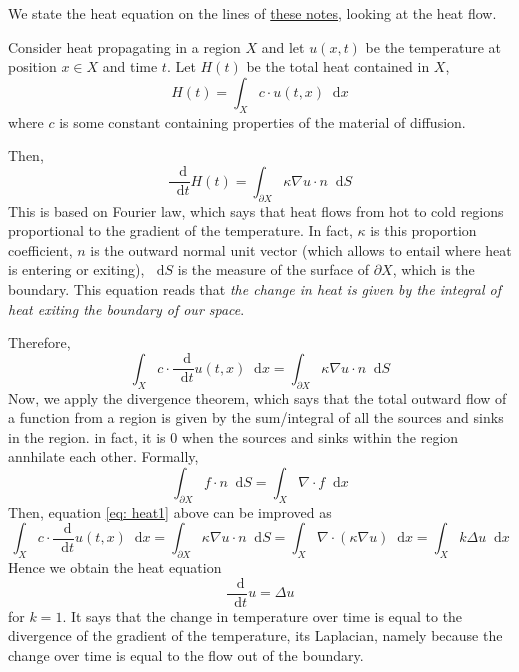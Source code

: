 \documentclass[a4paper,12pt,reqno]{amsbook}
\theoremstyle{definition} %
\newcommand*\de{\mathop{}\!\mathrm{d}}
\newcommand{\1}{\mathbbm{1}}
\newcommand{\nabladot}{\nabla \cdot} %
\newcommand{\dt}{\frac{\de}{\de t}}
\theoremstyle{plain}
\theoremstyle{remark}
\begin{document}
{We state the heat equation on the lines of \href{https://web.stanford.edu/class/math220b/handouts/heateqn.pdf}{these notes}, looking at the heat flow. 

Consider heat propagating in a region $X$ and let $u(x,t)$ be the temperature at position $x\in X$ and time $t$. Let $H(t)$ be the total heat contained in $X$, 
\[
H(t)=\int_X c \cdot u(t,x) \de x
\]
where $c$ is some constant containing properties of the material of diffusion. 

Then,
\[
\frac{\de}{\de t}H(t) = \int_{\partial X} \kappa \nabla u \cdot n \de S
\]
This is based on Fourier law, which says that heat flows from hot to cold regions proportional to the gradient of the temperature. In fact, $\kappa$ is this proportion coefficient, $n$ is the outward normal unit vector (which allows to entail where heat is entering or exiting), $\de S$ is the measure of the surface of $\partial X$, which is the boundary. This equation reads that \textit{the change in heat is given by the integral of heat exiting the boundary of our space}. 

Therefore,
\begin{equation}\label{eq: heat1}
\int_X c \cdot \dt u(t,x) \de x = \int_{\partial X} \kappa \nabla u \cdot n \de S
\end{equation}
Now, we apply the divergence theorem, which says that the total outward flow of a function from a region is given by the sum/integral of all the sources and sinks in the region. in fact, it is 0 when the sources and sinks within the region annhilate each other. Formally, 
\[
\int_{\partial X} f \cdot n \de S = \int_X \nabladot f \de x
\]
Then, equation \ref{eq: heat1} above can be improved as
\begin{equation*}
\int_X c \cdot \dt u(t,x) \de x = \int_{\partial X} \kappa \nabla u \cdot n \de S = \int_X \nabladot (\kappa \nabla u) \de x = \int_X k \Delta u \de x
\end{equation*}
Hence we obtain the heat equation 
\begin{equation}
    \dt u = \Delta u
\end{equation}
for $k=1$. It says that the change in temperature over time is equal to the divergence of the gradient of the temperature, its Laplacian, namely because the change over time is equal to the flow out of the boundary.
\\

}
\end{document}
